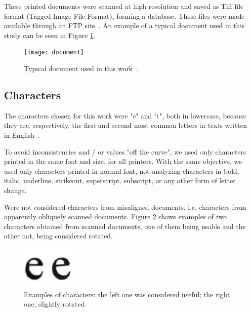 \documentclass[10pt,twocolumn,letterpaper]{article}
\begin{document}
These printed documents were scanned at high resolution and saved as Tiff file format (Tagged Image File Format), forming a database. These files were made available through an FTP site~\cite{Printers_dataset}. An example of a typical document used in this study can be seen in Figure \ref{fig:document}.

\begin{figure}
\begin{center}
	\texttt{[image: document]}
	\caption{Typical document used in this work~\cite{Wikipedia}.}
\label{fig:document}   
\end{center} 
\end{figure}

\subsection{Characters}
\label{subsec:characters}

The characters chosen for this work were "e" and "t", both in lowercase, because they are, respectively, the first and second most common letters in texts written in English~\cite{Letter_Frequency}.

To avoid inconsistencies and / or values "off the curve", we used only characters printed in the same font and size, for all printers. With the same objective, we used only characters printed in normal font, not analyzing characters in bold, italic, underline, strikeout, superscript, subscript, or any other form of letter change.

Were not considered characters from misaligned documents, i.e. characters from apparently obliquely scanned documents. Figure \ref{fig:characters} shows examples of two characters obtained from scanned documents, one of them being usable and the other not, being considered rotated.

\begin{figure}
\begin{center}
	\includegraphics[width=0.99\columnwidth]{characters}
	\caption{Examples of characters: the left one was considered useful; the right one, slightly rotated.}
\label{fig:characters}   
\end{center} 
\end{figure}
\end{document}
